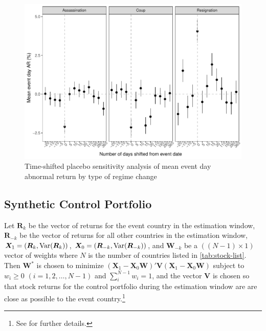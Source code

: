 \documentclass[12pt,final,fleqn]{article}
\theoremstyle{plain}
\newcommand\var{{\rm Var}}
\begin{document}
\begin{figure}[!ht]
\includegraphics{../figs/mean-ar-by-regime-change-type-placebo.pdf}
\caption{Time-shifted placebo sensitivity analysis of mean event day abnormal return by type of regime change}
\label{fig:mean-event-day-ar-by-regime-change}
\end{figure}

\subsection{Synthetic Control Portfolio}
Let $\boldsymbol{R}_{k}$ be the vector of returns for the event country in the estimation window, $\boldsymbol{R}_{-k}$ be the vector of returns for all other countries in the estimation window, $\boldsymbol{X}_1=(\boldsymbol{R}_{k},\var(\boldsymbol{R}_{k}))$, $\boldsymbol{X}_0=(\boldsymbol{R}_{-k},\var(\boldsymbol{R}_{-k}))$, and $\boldsymbol{W}_{-k}$ be a $((N-1) \times 1)$ vector of weights where $N$ is the number of countries listed in \autoref{tab:stock-list}. Then $\boldsymbol{W}^*$ is chosen to minimize $(\boldsymbol{X}_1-\boldsymbol{X}_0\boldsymbol{W})'\boldsymbol{V}(\boldsymbol{X}_1-\boldsymbol{X}_0\boldsymbol{W})$ subject to $w_i\geq0$ $(i = 1,2,\ldots,N-1)$ and $\sum_i^{N-1} w_i = 1$, and the vector $\boldsymbol{V}$ is chosen so that stock returns for the control portfolio during the estimation window are are close as possible to the event country.\footnote{See \citet{abadie2003economic} for further details.}

\newpage
{}

\end{document}

